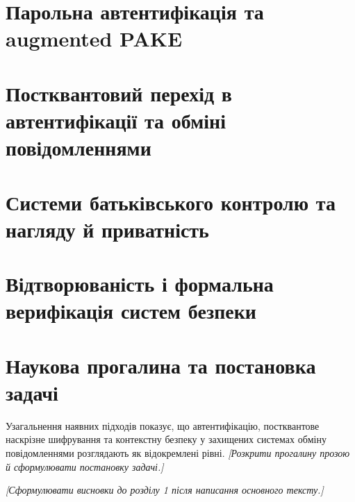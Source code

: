 \section{Парольна автентифікація та augmented PAKE}
\label{sec:pake-sota}

\section{Постквантовий перехід в автентифікації та обміні повідомленнями}
\label{sec:pq-transition}

\section{Системи батьківського контролю та нагляду й приватність}
\label{sec:supervision-sota}

\section{Відтворюваність і формальна верифікація систем безпеки}
\label{sec:repro-formal}

\section{Наукова прогалина та постановка задачі}
\label{sec:gap}
Узагальнення наявних підходів показує, що автентифікацію, постквантове наскрізне шифрування та контекстну безпеку у захищених системах обміну повідомленнями розглядають як відокремлені рівні. \emph{[Розкрити прогалину прозою й сформулювати постановку задачі.]}

\emph{[Сформулювати висновки до розділу 1 після написання основного тексту.]}
